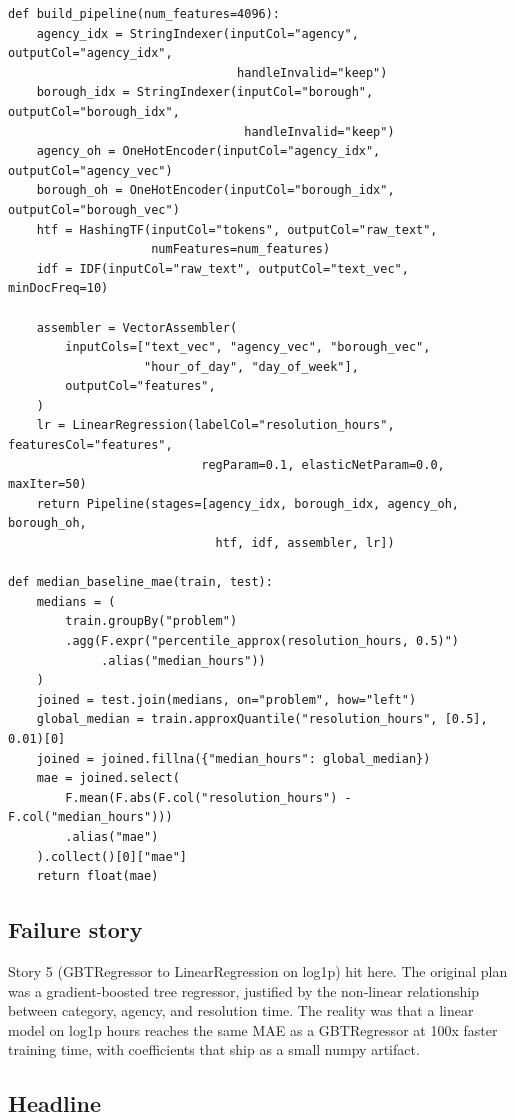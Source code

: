 \documentclass[11pt,letterpaper]{book}
\begin{document}
\begin{lstlisting}
def build_pipeline(num_features=4096):
    agency_idx = StringIndexer(inputCol="agency", outputCol="agency_idx",
                                handleInvalid="keep")
    borough_idx = StringIndexer(inputCol="borough", outputCol="borough_idx",
                                 handleInvalid="keep")
    agency_oh = OneHotEncoder(inputCol="agency_idx", outputCol="agency_vec")
    borough_oh = OneHotEncoder(inputCol="borough_idx", outputCol="borough_vec")
    htf = HashingTF(inputCol="tokens", outputCol="raw_text",
                    numFeatures=num_features)
    idf = IDF(inputCol="raw_text", outputCol="text_vec", minDocFreq=10)

    assembler = VectorAssembler(
        inputCols=["text_vec", "agency_vec", "borough_vec",
                   "hour_of_day", "day_of_week"],
        outputCol="features",
    )
    lr = LinearRegression(labelCol="resolution_hours", featuresCol="features",
                           regParam=0.1, elasticNetParam=0.0, maxIter=50)
    return Pipeline(stages=[agency_idx, borough_idx, agency_oh, borough_oh,
                             htf, idf, assembler, lr])

def median_baseline_mae(train, test):
    medians = (
        train.groupBy("problem")
        .agg(F.expr("percentile_approx(resolution_hours, 0.5)")
             .alias("median_hours"))
    )
    joined = test.join(medians, on="problem", how="left")
    global_median = train.approxQuantile("resolution_hours", [0.5], 0.01)[0]
    joined = joined.fillna({"median_hours": global_median})
    mae = joined.select(
        F.mean(F.abs(F.col("resolution_hours") - F.col("median_hours")))
        .alias("mae")
    ).collect()[0]["mae"]
    return float(mae)
\end{lstlisting}

\subsection*{Failure story}

Story 5 (GBTRegressor to LinearRegression on log1p) hit here. The original plan was a gradient-boosted tree regressor, justified by the non-linear relationship between category, agency, and resolution time. The reality was that a linear model on log1p hours reaches the same MAE as a GBTRegressor at 100x faster training time, with coefficients that ship as a small numpy artifact.

\subsection*{Headline}
\end{document}
